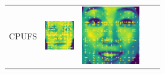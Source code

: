 \begin{table}[!ht]
\begin{tabular}{>{\centering\arraybackslash}p{0.95in}>{\centering\arraybackslash}p{1.0in}>{\centering\arraybackslash}p{1.0in}>{\centering\arraybackslash}p{1.0in}>{\centering\arraybackslash}p{1.0in}}
        CPUFS & \parbox[c]{1.0in}{
        \includegraphics[width=1\linewidth]{figures/CPUFS/visualization/feaCPUFS_ORL.pdf}} & \parbox[c]{1.0in}{
        \includegraphics[width=1\linewidth]{figures/CPUFS/visualization/feaCPUFS_JAFFE.pdf}} & \parbox[c]{1.0in}{
}
\end{tabular}
\end{table}
